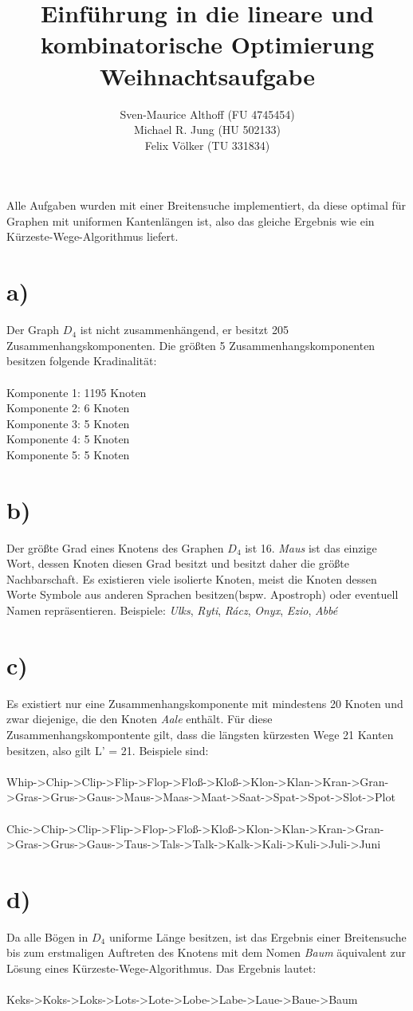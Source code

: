 \documentclass[a4paper,12pt,german]{scrartcl}
\title{Einführung in die lineare und kombinatorische Optimierung\\
Weihnachtsaufgabe}
\author{Sven-Maurice Althoff (FU 4745454)\\Michael R. Jung (HU 502133)\\Felix Völker (TU 331834)}
\begin{document}
\maketitle

Alle Aufgaben wurden mit einer Breitensuche implementiert, da diese optimal für Graphen mit uniformen Kantenlängen ist, also das gleiche Ergebnis wie ein Kürzeste-Wege-Algorithmus liefert.
\section*{a)}
Der Graph $D_4$ ist nicht zusammenhängend, er besitzt 205 Zusammenhangskomponenten.  Die größten 5 Zusammenhangskomponenten besitzen folgende Kradinalität:\\
\\
Komponente 1: 1195 Knoten\\
Komponente 2: 6 Knoten\\
Komponente 3: 5 Knoten\\
Komponente 4: 5 Knoten\\
Komponente 5: 5 Knoten
\section*{b)}
Der größte Grad eines Knotens des Graphen $D_4$ ist 16. \textit{Maus} ist das einzige Wort, dessen Knoten diesen Grad besitzt und besitzt daher die größte Nachbarschaft. Es existieren viele isolierte Knoten, meist die Knoten dessen Worte Symbole aus anderen Sprachen besitzen(bspw. Apostroph) oder eventuell Namen repräsentieren. Beispiele: \textit{Ulks}, \textit{Ryti}, \textit{Rácz}, \textit{Onyx}, \textit{Ezio}, \textit{Abbé}
\section*{c)}
Es existiert nur eine Zusammenhangskomponente mit mindestens 20 Knoten und zwar diejenige, die den Knoten \textit{Aale} enthält. Für diese Zusammenhangskompontente gilt, dass die längsten kürzesten Wege 21 Kanten besitzen, also gilt L' = 21. Beispiele sind:\\
\\
Whip->Chip->Clip->Flip->Flop->Floß->Kloß->Klon->Klan->Kran->Gran->Gras->Grus->Gaus->Maus->Maas->Maat->Saat->Spat->Spot->Slot->Plot\\
\\
Chic->Chip->Clip->Flip->Flop->Floß->Kloß->Klon->Klan->Kran->Gran->Gras->Grus->Gaus->Taus->Tals->Talk->Kalk->Kali->Kuli->Juli->Juni
\section*{d)}
Da alle Bögen in $D_4$ uniforme Länge besitzen, ist das Ergebnis einer Breitensuche bis zum erstmaligen Auftreten des Knotens mit dem Nomen \textit{Baum} äquivalent zur Lösung eines Kürzeste-Wege-Algorithmus. Das Ergebnis lautet:\\
\\
Keks->Koks->Loks->Lots->Lote->Lobe->Labe->Laue->Baue->Baum
\end{document}

